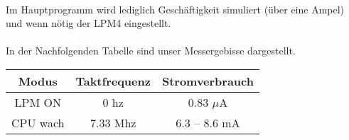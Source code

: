 

\paragraph*{}
Im Hauptprogramm wird lediglich Geschäftigkeit simuliert (über eine Ampel) und wenn nötig der LPM4 eingestellt. \\



\paragraph*{}
In der Nachfolgenden Tabelle sind unser Messergebisse dargestellt. \\

\begin{tabular}{ c | c | c }\hline \hline
Modus & Taktfrequenz & Stromverbrauch \\ \hline
LPM ON & 0 hz & 0.83 $\mu$A  \\ \hline
CPU wach & 7.33 Mhz & 6.3 – 8.6 mA \\ \hline
\end{tabular}




